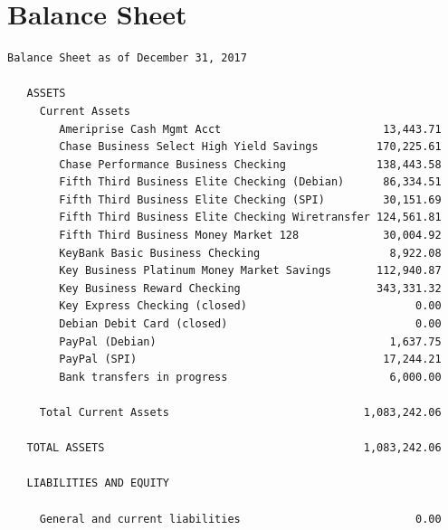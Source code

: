 \documentclass[a4paper]{report}
\begin{document}
\section{Balance Sheet}

\begin{verbatim}
Balance Sheet as of December 31, 2017

   ASSETS
     Current Assets
        Ameriprise Cash Mgmt Acct                         13,443.71
        Chase Business Select High Yield Savings         170,225.61
        Chase Performance Business Checking              138,443.58
        Fifth Third Business Elite Checking (Debian)      86,334.51
        Fifth Third Business Elite Checking (SPI)         30,151.69
        Fifth Third Business Elite Checking Wiretransfer 124,561.81
        Fifth Third Business Money Market 128             30,004.92
        KeyBank Basic Business Checking                    8,922.08
        Key Business Platinum Money Market Savings       112,940.87
        Key Business Reward Checking                     343,331.32
        Key Express Checking (closed)                          0.00
        Debian Debit Card (closed)                             0.00
        PayPal (Debian)                                    1,637.75
        PayPal (SPI)                                      17,244.21
        Bank transfers in progress                         6,000.00

     Total Current Assets                              1,083,242.06

   TOTAL ASSETS                                        1,083,242.06

   LIABILITIES AND EQUITY

     General and current liabilities                           0.00


\end{verbatim}
\end{document}
